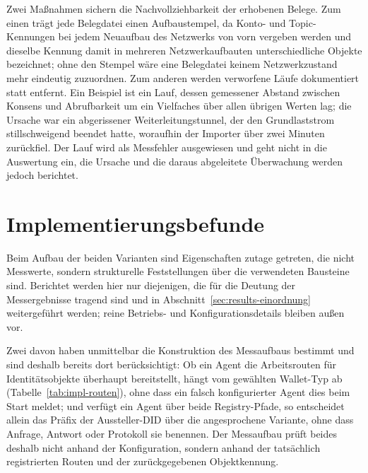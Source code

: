 Zwei Maßnahmen sichern die Nachvollziehbarkeit der erhobenen Belege. Zum einen trägt jede Belegdatei einen Aufbaustempel, da Konto- und Topic-Kennungen bei jedem Neuaufbau des Netzwerks von vorn vergeben werden und dieselbe Kennung damit in mehreren Netzwerkaufbauten unterschiedliche Objekte bezeichnet; ohne den Stempel wäre eine Belegdatei keinem Netzwerkzustand mehr eindeutig zuzuordnen. Zum anderen werden verworfene Läufe dokumentiert statt entfernt. Ein Beispiel ist ein Lauf, dessen gemessener Abstand zwischen Konsens und Abrufbarkeit um ein Vielfaches über allen übrigen Werten lag; die Ursache war ein abgerissener Weiterleitungstunnel, der den Grundlaststrom stillschweigend beendet hatte, woraufhin der Importer über zwei Minuten zurückfiel. Der Lauf wird als Messfehler ausgewiesen und geht nicht in die Auswertung ein, die Ursache und die daraus abgeleitete Überwachung werden jedoch berichtet.


\section{Implementierungsbefunde}
\label{sec:impl-befunde}

Beim Aufbau der beiden Varianten sind Eigenschaften zutage getreten, die nicht Messwerte, sondern strukturelle Feststellungen über die verwendeten Bausteine sind. Berichtet werden hier nur diejenigen, die für die Deutung der Messergebnisse tragend sind und in Abschnitt~\ref{sec:results-einordnung} weitergeführt werden; reine Betriebs- und Konfigurationsdetails bleiben außen vor.

Zwei davon haben unmittelbar die Konstruktion des Messaufbaus bestimmt und sind deshalb bereits dort berücksichtigt: Ob ein Agent die Arbeitsrouten für Identitätsobjekte überhaupt bereitstellt, hängt vom gewählten Wallet-Typ ab (Tabelle~\ref{tab:impl-routen}), ohne dass ein falsch konfigurierter Agent dies beim Start meldet; und verfügt ein Agent über beide Registry-Pfade, so entscheidet allein das Präfix der Aussteller-DID über die angesprochene Variante, ohne dass Anfrage, Antwort oder Protokoll sie benennen. Der Messaufbau prüft beides deshalb nicht anhand der Konfiguration, sondern anhand der tatsächlich registrierten Routen und der zurückgegebenen Objektkennung.

